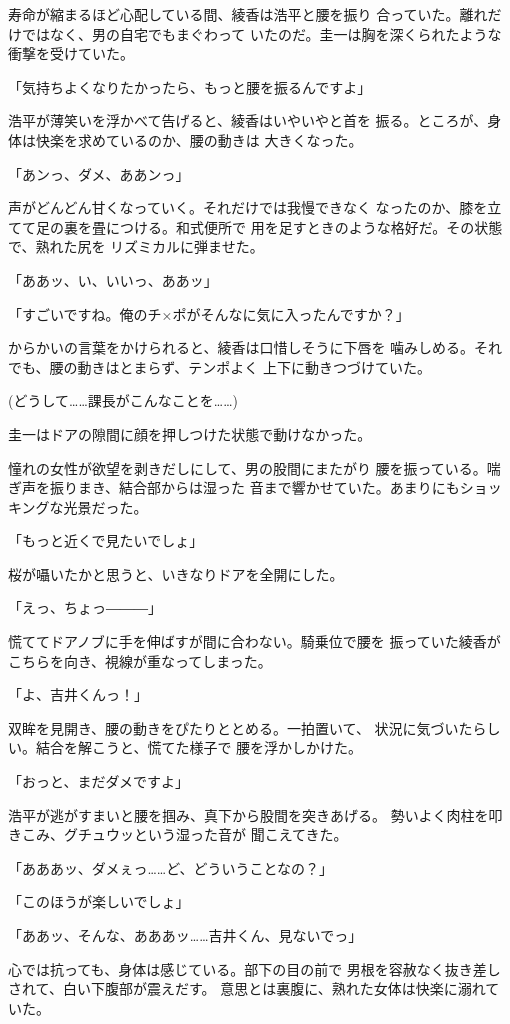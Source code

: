 ﻿\documentclass[
    book,tate,
    line_length=30zw,
    jafontsize=12pt,
    paper=b5j,
    landscape,
    ]{jlreq}
\begin{document}
寿命が縮まるほど心配している間、綾香は浩平と腰を振り
合っていた。離れだけではなく、男の自宅でもまぐわって
いたのだ。圭一は胸を深くられたような
衝撃を受けていた。

「気持ちよくなりたかったら、もっと腰を振るんですよ」

浩平が薄笑いを浮かべて告げると、綾香はいやいやと首を
振る。ところが、身体は快楽を求めているのか、腰の動きは
大きくなった。

「あンっ、ダメ、ああンっ」

声がどんどん甘くなっていく。それだけでは我慢できなく
なったのか、膝を立てて足の裏を畳につける。和式便所で
用を足すときのような格好だ。その状態で、熟れた尻を
リズミカルに弾ませた。

「ああッ、い、いいっ、ああッ」

「すごいですね。俺のチ×ポがそんなに気に入ったんですか？」

からかいの言葉をかけられると、綾香は口惜しそうに下唇を
噛みしめる。それでも、腰の動きはとまらず、テンポよく
上下に動きつづけていた。

(どうして……課長がこんなことを……)

圭一はドアの隙間に顔を押しつけた状態で動けなかった。

憧れの女性が欲望を剥きだしにして、男の股間にまたがり
腰を振っている。喘ぎ声を振りまき、結合部からは湿った
音まで響かせていた。あまりにもショッキングな光景だった。

「もっと近くで見たいでしょ」

桜が囁いたかと思うと、いきなりドアを全開にした。

「えっ、ちょっ―――」

慌ててドアノブに手を伸ばすが間に合わない。騎乗位で腰を
振っていた綾香がこちらを向き、視線が重なってしまった。

「よ、吉井くんっ！」

双眸を見開き、腰の動きをぴたりととめる。一拍置いて、
状況に気づいたらしい。結合を解こうと、慌てた様子で
腰を浮かしかけた。

「おっと、まだダメですよ」

浩平が逃がすまいと腰を掴み、真下から股間を突きあげる。
勢いよく肉柱を叩きこみ、グチュウッという湿った音が
聞こえてきた。

「あああッ、ダメぇっ……ど、どういうことなの？」

「このほうが楽しいでしょ」

「ああッ、そんな、あああッ……吉井くん、見ないでっ」

心では抗っても、身体は感じている。部下の目の前で
男根を容赦なく抜き差しされて、白い下腹部が震えだす。
意思とは裏腹に、熟れた女体は快楽に溺れていた。
\end{document}
